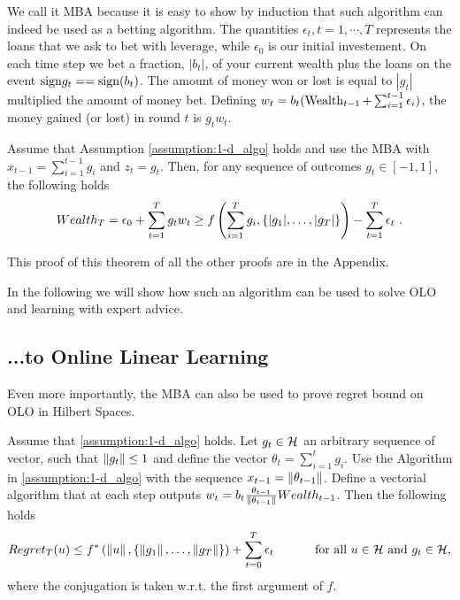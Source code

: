 We call it \ac{MBA} because it is easy to show by induction that such algorithm can indeed be used as a betting algorithm.
The quantities $\epsilon_t, t=1,\cdots,T$ represents the loans that we ask to bet with leverage, while $\epsilon_0$ is our initial investement.
On each time step we bet a fraction, $|b_t|$, of your current wealth plus the loans on the event $\sign{g_t}==\sign(b_t)$.
The amount of money won or lost is equal to $|g_t|$ multiplied the amount of money bet.
Defining $w_t=b_t (\operatorname{Wealth}_{t-1}+\sum_{i=1}^{t-1} \epsilon_i)$, the money gained (or lost) in round $t$ is $g_t w_t$.
\begin{theorem}
\label{theo:1-d_reward}
Assume that Assumption \ref{assumption:1-d_algo} holds and use the \ac{MBA} with $x_{t-1}=\sum_{i=1}^{t-1} g_i$ and $z_t=g_t$.
Then, for any sequence of outcomes $g_t \in [-1,1]$, the following holds
\[
Wealth_T = \epsilon_0 + \sum_{t=1}^T g_t w_t \geq f\left( \sum_{i=1}^{T} g_i , \left\{|g_1|, \ldots, |g_T|\right\}\right)-\sum_{t=1}^T \epsilon_t~.
\]
\end{theorem}
This proof of this theorem of all the other proofs are in the Appendix.

In the following we will show how such an algorithm can be used to solve \ac{OLO} and learning with expert advice.

\subsection{...to Online Linear Learning}

Even more importantly, the \ac{MBA} can also be used to prove regret bound on \ac{OLO} in Hilbert Spaces.

\begin{theorem}
\label{theo:hilbert_reward}
  Assume that \ref{assumption:1-d_algo} holds.
  Let $g_t \in \mathcal{H}$ an arbitrary sequence of vector, such that $\left\|{g_t}\right\| \leq 1$ and define the vector $\theta_t=\sum_{i=1}^{t} g_i$.
  Use the Algorithm in \ref{assumption:1-d_algo} with the sequence $x_{t-1}= \left\|{\theta_{t-1}}\right\|$.
  Define a vectorial algorithm that at each step outputs $w_t = b_t \frac{\theta_{t-1}}{\left\|{\theta_{t-1}}\right\|} Wealth_{t-1}$. Then the following holds
  \[
    Regret_T(u) \leq f^*\left( \left\|{u}\right\|, \left\{\left\|{g_1}\right\|, \ldots, \left\|{g_T}\right\|\right\}\right)+\sum_{t=0}^T \epsilon_t \quad \quad \quad \textnormal{ for all } u \in \mathcal{H} \textnormal{ and } g_t \in \mathcal{H},
  \]
  where the conjugation is taken w.r.t. the first argument of $f$.
\end{theorem}

